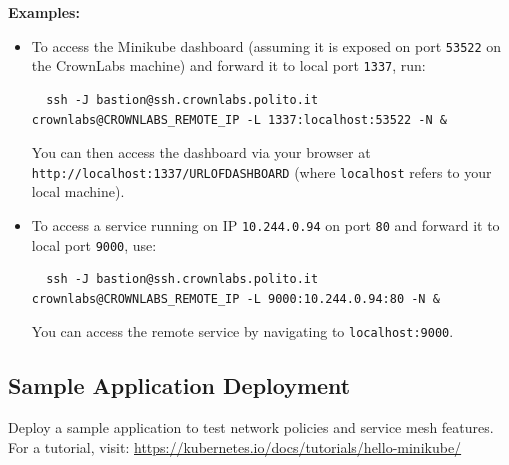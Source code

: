 \documentclass{article}
\begin{document}
  \vspace{0.5cm}
  
  \textbf{Examples:}
  \begin{itemize}
      \item To access the Minikube dashboard (assuming it is exposed on port \texttt{53522} on the CrownLabs machine) and forward it to local port \texttt{1337}, run:
      \begin{lstlisting}
  ssh -J bastion@ssh.crownlabs.polito.it crownlabs@CROWNLABS_REMOTE_IP -L 1337:localhost:53522 -N &
      \end{lstlisting}
      You can then access the dashboard via your browser at \texttt{http://localhost:1337/URLOFDASHBOARD} (where \texttt{localhost} refers to your local machine).
      
      \item To access a service running on IP \texttt{10.244.0.94} on port \texttt{80} and forward it to local port \texttt{9000}, use:
      \begin{lstlisting}
  ssh -J bastion@ssh.crownlabs.polito.it crownlabs@CROWNLABS_REMOTE_IP -L 9000:10.244.0.94:80 -N &
      \end{lstlisting}
      You can access the remote service by navigating to \texttt{localhost:9000}.
  \end{itemize}
  

\subsection{Sample Application Deployment}

Deploy a sample application to test network policies and service mesh features. For a tutorial, visit: \footnotesize\url{https://kubernetes.io/docs/tutorials/hello-minikube/}\normalsize \\
\end{document}
